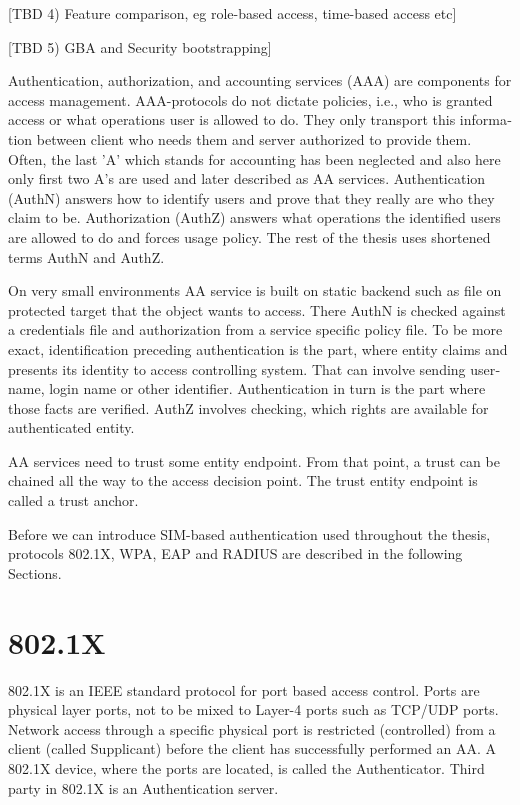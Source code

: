 \documentclass[12pt,a4paper,english]{tutthesis}
\begin{document}
\begin{otherlanguage}{english}
[TBD 4) Feature comparison, eg role-based access, time-based access
etc]

[TBD 5) GBA and Security bootstrapping]

Authentication, authorization, and accounting services (AAA) are
components for access management.  AAA-protocols do not dictate
policies, i.e., who is granted access or what operations user is
allowed to do. They only transport this information between client
who needs them and server authorized to provide them.
Often, the last 'A' which stands for accounting has been neglected
and also here only first two A's are used and later described as AA
services. Authentication (AuthN) answers how to identify users and
prove that they really are who they claim to be. Authorization (AuthZ)
answers what operations the identified users are allowed to do and
forces usage policy. The rest of the thesis uses shortened terms AuthN
and AuthZ.

On very small environments AA service is built on static backend such
as file on protected target that the object wants to access. There AuthN
is checked against a credentials file and authorization from a service
specific policy file. 
To be more exact, identification preceding authentication is the part,
where entity claims and presents its identity to 
access controlling system. That can involve sending username, login
name or other identifier. Authentication in turn is the part where
those facts are verified. AuthZ involves checking, which rights are 
available for authenticated entity. 

AA services need to trust some entity endpoint. From that point, a trust
can be chained all the way to the access decision point. The trust
entity endpoint is called a trust anchor.

Before we can introduce SIM-based authentication used throughout the
thesis, protocols 802.1X, WPA, EAP and RADIUS are described in the following Sections.

\section{802.1X}
\label{sec-2-1}

802.1X \cite{8021X} is an IEEE standard protocol for port based access
control. Ports are physical layer ports, not to be mixed to Layer-4 ports such as TCP/UDP ports.
 Network access through a specific physical port is
restricted (controlled) from a client (called Supplicant) before
the client has successfully performed an AA. A 802.1X device, where
the ports are located, is called the Authenticator. Third party in 802.1X is an
Authentication server. 




\end{otherlanguage}
\end{document}
